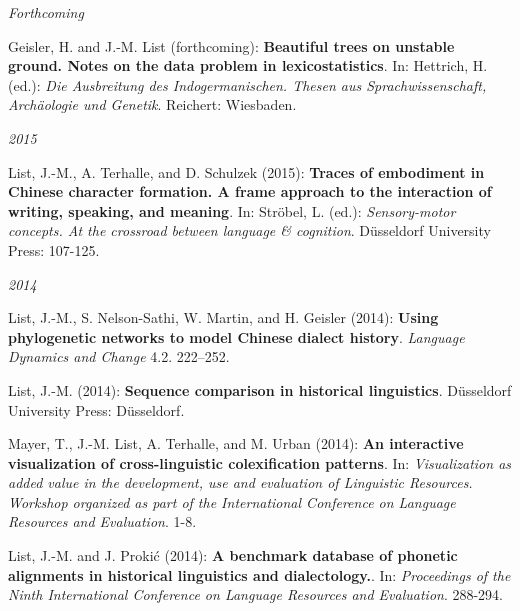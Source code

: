 \noindent\textit{{Forthcoming}}\par\nopagebreak\vspace{0.25cm}
\nopagebreak\noindent Geisler, H. and J.-M. List (forthcoming): \textbf{Beautiful trees on unstable ground. Notes on the data problem in lexicostatistics}. In: Hettrich, H. (ed.): \textit{Die Ausbreitung des Indogermanischen. Thesen aus Sprachwissenschaft, Archäologie und Genetik}. Reichert: Wiesbaden. \vspace{0.25cm}
\par
\noindent\textit{2015}\par\nopagebreak\vspace{0.25cm}
\nopagebreak\noindent List, J.-M., A. Terhalle, and D. Schulzek (2015): \textbf{Traces of embodiment in Chinese character formation. A frame approach to the interaction of writing, speaking, and meaning}. In: Ströbel, L. (ed.): \textit{Sensory-motor concepts. At the crossroad between language \& cognition}. Düsseldorf University Press: 107-125.\vspace{0.25cm}
\par
\noindent\textit{2014}\par\nopagebreak\vspace{0.25cm}
\nopagebreak\noindent List, J.-M., S. Nelson-Sathi, W. Martin, and H. Geisler (2014): \textbf{Using phylogenetic networks to model Chinese dialect history}. \textit{Language Dynamics and Change} 4.2. 222–252.\vspace{0.25cm}
\par
\nopagebreak\noindent List, J.-M. (2014): \textbf{Sequence comparison in historical linguistics}. Düsseldorf University Press: Düsseldorf.\vspace{0.25cm}
\par
\nopagebreak\noindent Mayer, T., J.-M. List, A. Terhalle, and M. Urban (2014): \textbf{An interactive visualization of cross-linguistic colexification patterns}. In: \textit{Visualization as added value in the development, use and evaluation of Linguistic Resources. Workshop organized as part of the International Conference on Language Resources and Evaluation}. 1-8.\vspace{0.25cm}
\par
\nopagebreak\noindent List, J.-M. and J. Prokić (2014): \textbf{A benchmark database of phonetic alignments in historical linguistics and dialectology.}. In: \textit{Proceedings of the Ninth International Conference on Language Resources and Evaluation}. 288-294.\vspace{0.25cm}
